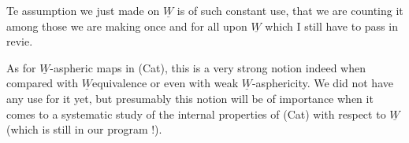 Te assumption we just made on $\underline{W}$ is of such constant use,  that we
are counting it among those we are making once and for all upon $\underline{W}$ 
\hand{(}which I\hand{\unsure{*}} still have to pass in revie\hand{)}.

As for $\underline{W}$-aspheric maps in (Cat),  this is a very strong notion indeed
when compared with $\underline{W}$\hand{-}equivalence or even with weak $\underline{W}$-asphericity.  We
did not have any use for it yet,  but presumably this notion will be of
importance when it comes to a systematic study of the internal properties
of (Cat) with respect to $\underline{W}$ (which is still in our program !).

